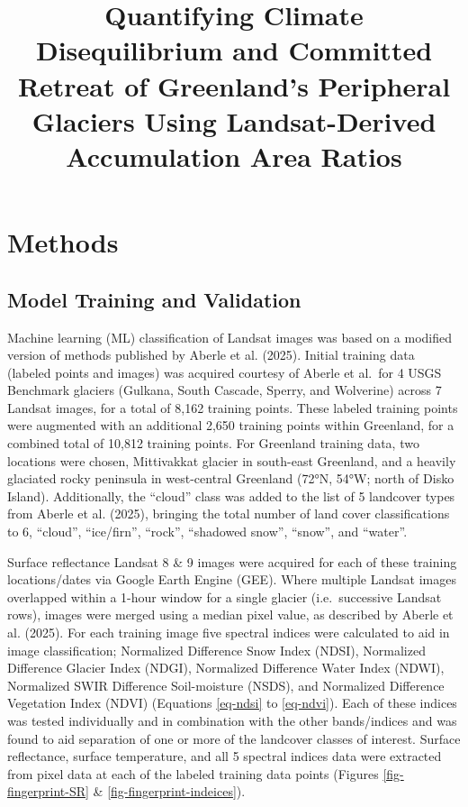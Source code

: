 \documentclass[
]{agujournal2019}
\begin{document}
\title{Quantifying Climate Disequilibrium and Committed Retreat of
Greenland's Peripheral Glaciers Using Landsat-Derived Accumulation Area
Ratios}








\section{Methods}\label{sec-methods}

\subsection{Model Training and Validation}\label{sec-training}

Machine learning (ML) classification of Landsat images was based on a
modified version of methods published by Aberle et al. (2025). Initial
training data (labeled points and images) was acquired courtesy of
Aberle et al.~for 4 USGS Benchmark glaciers (Gulkana, South Cascade,
Sperry, and Wolverine) across 7 Landsat images, for a total of 8,162
training points. These labeled training points were augmented with an
additional 2,650 training points within Greenland, for a combined total
of 10,812 training points. For Greenland training data, two locations
were chosen, Mittivakkat glacier in south-east Greenland, and a heavily
glaciated rocky peninsula in west-central Greenland (72°N, 54°W; north
of Disko Island). Additionally, the ``cloud'' class was added to the
list of 5 landcover types from Aberle et al. (2025), bringing the total
number of land cover classifications to 6, ``cloud'', ``ice/firn'',
``rock'', ``shadowed snow'', ``snow'', and ``water''.

Surface reflectance Landsat 8 \& 9 images were acquired for each of
these training locations/dates via Google Earth Engine (GEE). Where
multiple Landsat images overlapped within a 1-hour window for a single
glacier (i.e.~successive Landsat rows), images were merged using a
median pixel value, as described by Aberle et al. (2025). For each
training image five spectral indices were calculated to aid in image
classification; Normalized Difference Snow Index (NDSI),
Normalized Difference Glacier Index (NDGI),
Normalized Difference Water Index (NDWI),
Normalized SWIR Difference Soil-moisture (NSDS), and
Normalized Difference Vegetation Index (NDVI) (Equations \ref{eq-ndsi}
to \ref{eq-ndvi}). Each of these indices was tested individually and in
combination with the other bands/indices and was found to aid separation
of one or more of the landcover classes of interest. Surface
reflectance, surface temperature, and all 5 spectral indices data were
extracted from pixel data at each of the labeled training data points
(Figures \ref{fig-fingerprint-SR} \& \ref{fig-fingerprint-indeices}).
\end{document}
